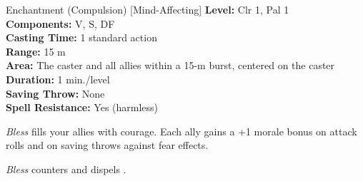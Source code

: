{Enchantment (Compulsion) [Mind-Affecting]}
{
	\textbf{Level:}
	Clr 1, Pal 1\\
	\textbf{Components:}
	V, S, DF\\
	\textbf{Casting Time:}
	1 standard action\\
	\textbf{Range:}
	15 m\\
	\textbf{Area:}
	The caster and all allies within a 15-m burst, centered on the caster\\
	\textbf{Duration:}
	1 min./level\\
	\textbf{Saving Throw:}
	None\\
	\textbf{Spell Resistance:}
	Yes (harmless)\\
}
{
	\emph{Bless} fills your allies with courage. Each ally gains a +1 morale bonus on attack rolls and on saving throws against fear effects.

	\emph{Bless} counters and dispels .

}
